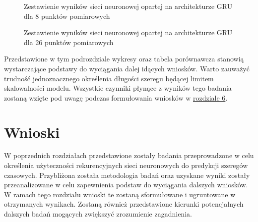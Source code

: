 \documentclass[10pt,a4paper]{article}
\begin{document}
\begin{figure}[!ht]
	\centering
	\caption{Zestawienie wyników sieci neuronowej opartej na architekturze GRU dla 8 punktów pomiarowych}
	\label{figure:scale_8}
\end{figure}
\FloatBarrier

\begin{figure}[!ht]
	\centering
	\caption{Zestawienie wyników sieci neuronowej opartej na architekturze GRU dla 26 punktów pomiarowych}
	\label{figure:scale_26}
\end{figure}
\FloatBarrier

Przedstawione w tym podrozdziale wykresy oraz tabela porównawcza stanowią wystarczające podstawy do wyciągania dalej idących wniosków. Warto zauważyć trudność jednoznacznego określenia długości szeregu będącej limitem skalowalności modelu. Wszystkie czynniki płynące z wyników tego badania zostaną wzięte pod uwagę podczas formułowania wniosków w \hyperlink{section.6}{rozdziale 6}.

\newpage
\section{Wnioski}
W poprzednich rozdziałach przedstawione zostały badania przeprowadzone w celu określenia użyteczności rekurencyjnych sieci neuronowych do predykcji szeregów czasowych. Przybliżona została metodologia badań oraz uzyskane wyniki zostały przeanalizowane w celu zapewnienia podstaw do wyciągania dalszych wniosków. W ramach tego rozdziału wnioski te zostaną sformułowane i ugruntowane w otrzymanych wynikach. Zostaną również przedstawione kierunki potencjalnych dalszych badań mogących zwiększyć zrozumienie zagadnienia.
\end{document}
